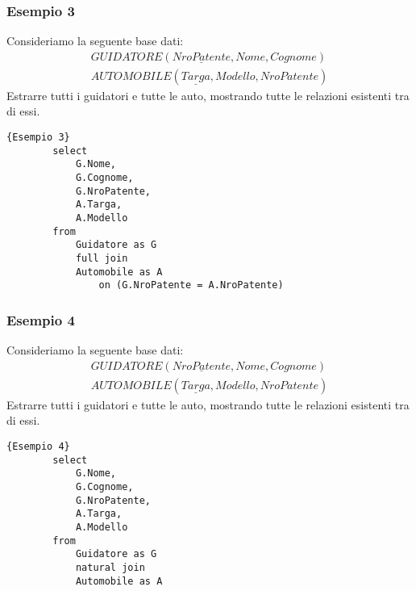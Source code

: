 \subsubsection{Esempio 3}
Consideriamo la seguente base dati:
    \begin{equation}\begin{aligned}
        GUIDATORE (\underline{NroPatente}, Nome, Cognome)\\
        AUTOMOBILE (\underline{Targa}, Modello, NroPatente)
    \end{aligned}\end{equation}
Estrarre tutti i guidatori e tutte le auto, mostrando tutte le relazioni esistenti tra di essi.
    \begin{lstlisting}{Esempio 3}
        select 
            G.Nome,
            G.Cognome, 
            G.NroPatente,
            A.Targa,
            A.Modello
        from 
            Guidatore as G
            full join 
            Automobile as A
                on (G.NroPatente = A.NroPatente)
    \end{lstlisting}
    
\subsubsection{Esempio 4}
Consideriamo la seguente base dati:
    \begin{equation}\begin{aligned}
        GUIDATORE (\underline{NroPatente}, Nome, Cognome)\\
        AUTOMOBILE (\underline{Targa}, Modello, NroPatente)
    \end{aligned}\end{equation}
Estrarre tutti i guidatori e tutte le auto, mostrando tutte le relazioni esistenti tra di essi.
    \begin{lstlisting}{Esempio 4}
        select 
            G.Nome,
            G.Cognome, 
            G.NroPatente,
            A.Targa,
            A.Modello
        from 
            Guidatore as G
            natural join 
            Automobile as A
    \end{lstlisting}
